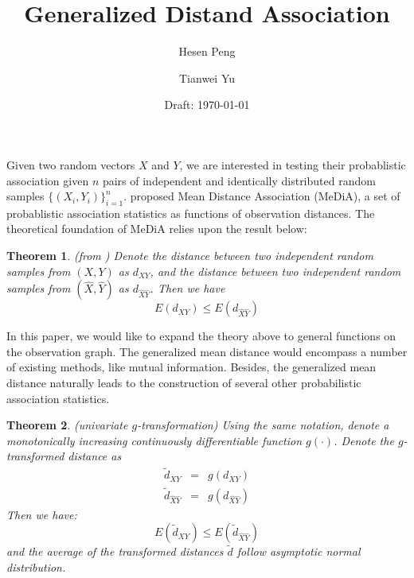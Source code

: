\documentclass[12pt,letterpaper]{article}
\newtheorem{thm}{Theorem}
\begin{document}


\title{Generalized Distand Association} 
\author{Hesen Peng \and Tianwei Yu}
\date{Draft: \today{}} 
\maketitle{}

Given two random vectors $X$ and $Y$, we are interested in testing
their probablistic association given $n$ pairs of independent and
identically distributed random samples $\{(X_i, Y_i)\}_{i=1}^n$.
\cite{cite:10.1371/journal.pone.0124620} proposed Mean Distance
Association (MeDiA), a set of probablistic association statistics as
functions of observation distances. The theoretical foundation of
MeDiA relies upon the result below: 

\begin{thm}
  \label{thm:1} 
  (from \cite{cite:10.1371/journal.pone.0124620}) Denote the distance
  between two independent random samples from $(X,Y)$ as $d_{XY}$, and
  the distance between two independent random samples from
  $(\hat{X},\hat{Y})$ as $d_{\hat{X}\hat{Y}}$. Then we have
  \begin{displaymath}
    E(d_{XY}) \le E(d_{\hat{X}\hat{Y}})
  \end{displaymath}
\end{thm}

In this paper, we would like to expand the theory above to general
functions on the observation graph. The generalized mean distance
would encompass a number of existing methods, like mutual
information. Besides, the generalized mean distance naturally leads to
the construction of several other probabilistic association
statistics.

\begin{thm}
  \label{thm:2}
  (univariate $g$-transformation) Using the same notation, denote a
  monotonically increasing continuously differentiable function
  $g(\cdot)$. Denote the $g$-transformed distance as
  \begin{eqnarray*}
    \tilde{d}_{XY} &=& g(d_{XY})\\
    \tilde{d}_{\hat{X}\hat{Y}} &=& g(d_{\hat{X}\hat{Y}})
  \end{eqnarray*}
  Then we have:
  \begin{displaymath}
    E(\tilde{d}_{XY}) \le E(\tilde{d}_{\hat{X}\hat{Y}})
  \end{displaymath}
  and the average of the transformed distances $\tilde{d}$ follow
  asymptotic normal distribution.
\end{thm}
\end{document}
